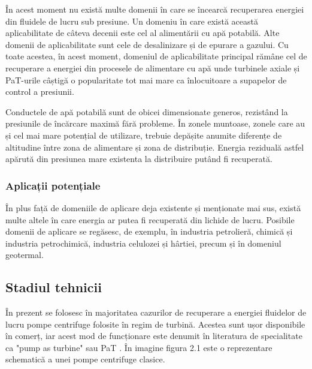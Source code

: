 În acest moment nu există multe domenii în care se încearcă recuperarea energiei din fluidele de lucru sub presiune. Un domeniu în care există această aplicabilitate de câteva decenii este cel al alimentării cu apă potabilă. Alte domenii de aplicabilitate sunt cele de desalinizare și de epurare a gazului. Cu toate acestea, în acest moment, domeniul de aplicabilitate principal rămâne cel de recuperare a energiei din procesele de alimentare cu apă unde turbinele axiale și PaT-urile câștigă o popularitate tot mai mare ca înlocuitoare a supapelor de control a presiunii.

Conductele de apă potabilă sunt de obicei dimensionate generos, rezistând la presiunile de încărcare maximă fără probleme. În zonele muntoase, zonele care au și cel mai mare potențial de utilizare, trebuie depășite anumite diferențe de altitudine între zona de alimentare și zona de distribuție. Energia reziduală astfel apărută din presiunea mare existenta la distribuire putând fi recuperată.


\subsubsection{Aplicații potențiale}

În plus față de domeniile de aplicare deja existente și menționate mai sus, există multe altele în care energia ar putea fi recuperată din lichide de lucru. Posibile domenii de aplicare se regăsesc, de exemplu, în industria petrolieră, chimică și industria petrochimică, industria celulozei și hârtiei, precum și în domeniul geotermal.


\subsection{Stadiul tehnicii}

În prezent se folosesc în majoritatea cazurilor de recuperare a energiei fluidelor de lucru pompe centrifuge folosite în regim de turbină. Acestea sunt ușor disponibile în comerț, iar acest mod de funcționare este denumit în literatura de specialitate ca "pump as turbine" sau PaT \cite{morabito2019pump}. În imagine figura 2.1 este o reprezentare schematică a unei pompe centrifuge clasice.

